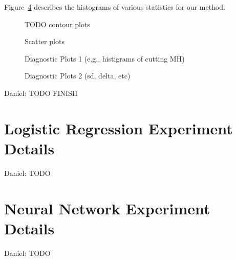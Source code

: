 \documentclass{article}
\begin{document}
Figure~\ref{fig:diagnostics} describes the histograms of various statistics for our method.

\begin{figure}[ht]
  \centering
  \fbox{\rule[-.5cm]{0cm}{4cm} \rule[-.5cm]{4cm}{0cm}}
  \caption{TODO contour plots}
  \label{fig:contour}
\end{figure}

\begin{figure}[ht]
  \centering
  \fbox{\rule[-.5cm]{0cm}{4cm} \rule[-.5cm]{4cm}{0cm}}
  \caption{Scatter plots}
  \label{fig:scatter}
\end{figure}

\begin{figure}[ht]
  \centering
  \fbox{\rule[-.5cm]{0cm}{4cm} \rule[-.5cm]{4cm}{0cm}}
  \caption{Diagnostic Plots 1 (e.g., histigrams of cutting MH)}
  \label{fig:cutting_mh}
\end{figure}

\begin{figure}[ht]
  \centering
  \fbox{\rule[-.5cm]{0cm}{4cm} \rule[-.5cm]{4cm}{0cm}}
  \caption{Diagnostic Plots 2 (sd, delta, etc)}
  \label{fig:diagnostics}
\end{figure}



{\color{blue}
Daniel: TODO FINISH
}

\section{Logistic Regression Experiment Details}

{\color{blue}
Daniel: TODO
}

\section{Neural Network Experiment Details}

{\color{blue}
Daniel: TODO
}

\end{document}
